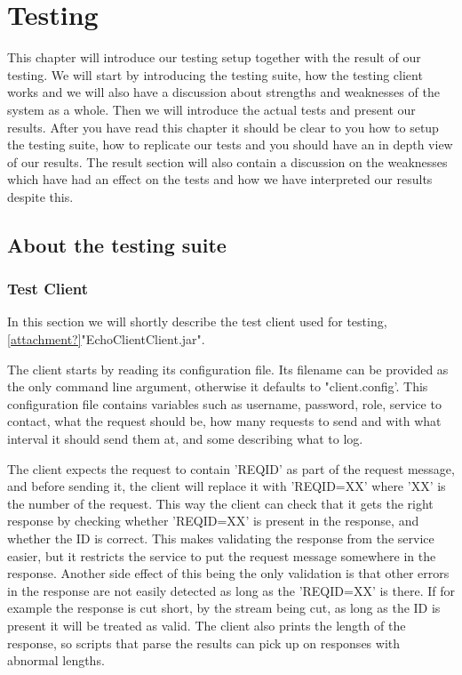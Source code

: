 \section{Testing}\label{Testing}
	This chapter will introduce our testing setup together with the result of our testing. We will start by introducing the testing suite, how the testing client works and we will also have a discussion about strengths and weaknesses of the system as a whole. Then we will introduce the actual tests and present our results. After you have read this chapter it should be clear to you how to setup the testing suite, how to replicate our tests and you should have an in depth view of our results. The result section will also contain a discussion on the weaknesses which have had an effect on the tests and how we have interpreted our results despite this.
    
    
    \subsection{About the testing suite}\label{Testing:About}
        \subsubsection{Test Client}\label{Testing:About:Client}
            In this section we will shortly describe the test client used for testing, \ref{attachment?}"EchoClientClient.jar".

            The client starts by reading its configuration file. Its filename can be provided as the only command line argument, otherwise it defaults to "client.config'. This configuration file contains variables such as username, password, role, service to contact, what the request should be, how many requests to send and with what interval it should send them at, and some describing what to log.

            The client expects the request to contain '{REQID}' as part of the request message, and before sending it, the client will replace it with '{REQID=XX}' where 'XX' is the number of the request. This way the client can check that it gets the right response by checking whether '{REQID=XX}' is present in the response, and whether the ID is correct. This makes validating the response from the service easier, but it restricts the service to put the request message somewhere in the response. Another side effect of this being the only validation is that other errors in the response are not easily detected as long as the '{REQID=XX}' is there. If for example the response is cut short, by the stream being cut, as long as the ID is present it will be treated as valid. The client also prints the length of the response, so scripts that parse the results can pick up on responses with abnormal lengths.

